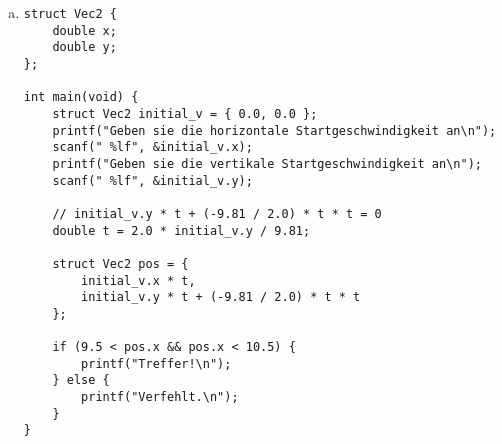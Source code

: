 \documentclass{standalone}
\begin{document}
\begin{enumerate}[a)]
\begin{verbatim}
    // initial_v.y + (-9.81) * t = 0
    double t = initial_v.y / 9.81;

    struct Vec2 pos = {
        initial_v.x * t,
        initial_v.y * t + (-9.81 / 2.0) * t * t
    };

    printf("Höchster Punkt: (%.2lf, %.2lf)\n", pos.x, pos.y);
}
    \end{verbatim}

\item
    \begin{verbatim}
struct Vec2 {
    double x;
    double y;
};

int main(void) {
    struct Vec2 initial_v = { 0.0, 0.0 };
    printf("Geben sie die horizontale Startgeschwindigkeit an\n");
    scanf(" %lf", &initial_v.x);
    printf("Geben sie die vertikale Startgeschwindigkeit an\n");
    scanf(" %lf", &initial_v.y);

    // initial_v.y * t + (-9.81 / 2.0) * t * t = 0
    double t = 2.0 * initial_v.y / 9.81;

    struct Vec2 pos = {
        initial_v.x * t,
        initial_v.y * t + (-9.81 / 2.0) * t * t
    };

    if (9.5 < pos.x && pos.x < 10.5) {
        printf("Treffer!\n");
    } else {
        printf("Verfehlt.\n");
    }
}
    \end{verbatim}

\end{enumerate}
\end{document}
